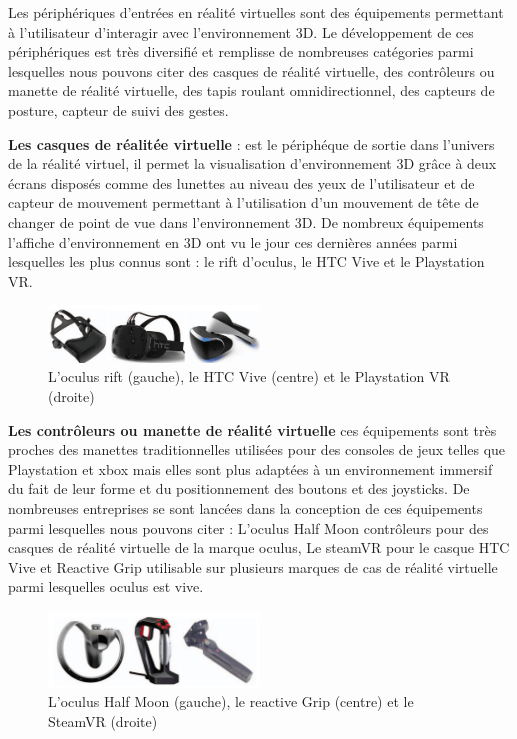 Les périphériques d'entrées en réalité virtuelles sont des équipements permettant à l'utilisateur d'interagir avec l'environnement 3D.
Le développement de ces périphériques est très diversifié et remplisse de nombreuses catégories parmi lesquelles nous pouvons citer des casques de réalité virtuelle, des contrôleurs ou manette de réalité virtuelle, des tapis roulant omnidirectionnel, des capteurs de posture, capteur de suivi des gestes\cite{anthes2016state}.

\textbf{Les casques de réalitée virtuelle} : est le périphéque de sortie dans l'univers de la réalité virtuel, il permet la visualisation d'environnement 3D grâce à deux écrans disposés comme des lunettes au niveau des yeux de l'utilisateur et de capteur de mouvement permettant à l'utilisation d'un mouvement de tête de changer de point de vue dans l'environnement 3D.
De nombreux équipements l'affiche d'environnement en 3D ont vu le jour ces dernières années parmi lesquelles les plus connus sont : le rift d'oculus, le HTC Vive et le Playstation VR.

\begin{figure}[H]
	\centering
	\includegraphics[width=0.5\textwidth]{img/3dcs}
	\caption{L'oculus rift (gauche), le HTC Vive (centre) et le Playstation VR (droite) }
\end{figure}

\textbf{Les contrôleurs ou manette de réalité virtuelle} ces équipements sont très proches des manettes traditionnelles utilisées pour des consoles de jeux telles que Playstation et xbox mais elles sont plus adaptées à un environnement immersif du fait de leur forme et du positionnement des boutons et des joysticks.
De nombreuses entreprises se sont lancées dans la conception de ces équipements parmi lesquelles nous pouvons citer : L'oculus Half Moon contrôleurs pour des casques de réalité virtuelle de la marque oculus, Le steamVR pour le casque HTC Vive et Reactive Grip utilisable sur plusieurs marques de cas de réalité virtuelle parmi lesquelles oculus est vive.

\begin{figure}[H]
	\centering
	\includegraphics[width=0.5\textwidth]{img/3dcon}
	\caption{L'oculus Half Moon (gauche), le reactive Grip (centre) et le SteamVR (droite) }
\end{figure}

